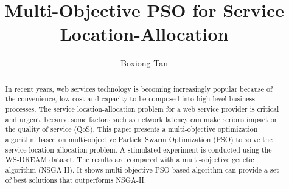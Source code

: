 \documentclass[11pt
              , a4paper
              , twoside
              , openright
              ]{report}
\title{Multi-Objective PSO for Service Location-Allocation}
\author{Boxiong Tan}
\date{}
\begin{document}
\frontmatter



\begin{abstract}
In recent years, web services technology is becoming increasingly popular because of the convenience, 
low cost and capacity to be composed into high-level business processes. 
The service location-allocation problem for a web service provider is critical and urgent,
because some factors such as network latency can make serious impact on the quality of service (QoS). 
This paper presents a multi-objective optimization algorithm based on multi-objective Particle Swarm Optimization (PSO) to solve the service location-allocation problem. 
A stimulated experiment is conducted using the WS-DREAM dataset. 
The results are compared with a multi-objective genetic algorithm (NSGA-II). 
It shows multi-objective PSO based algorithm can provide a set of best solutions that outperforms NSGA-II.

\end{abstract}


\maketitle

%

\tableofcontents



\mainmatter




%




\backmatter



%


\end{document}
